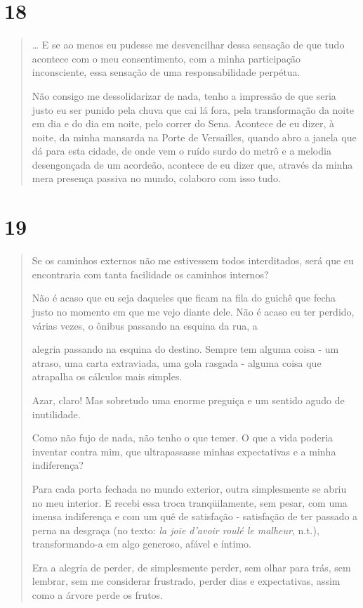 \section{18}\label{section-17}

\begin{quote}
\ldots{} E se ao menos eu pudesse me desvencilhar dessa sensação de que
tudo acontece com o meu consentimento, com a minha participação
inconsciente, essa sensação de uma responsabilidade perpétua.

Não consigo me dessolidarizar de nada, tenho a impressão de que seria
justo eu ser punido pela chuva que cai lá fora, pela transformação da
noite em dia e do dia em noite, pelo correr do Sena. Acontece de eu
dizer, à noite, da minha mansarda na Porte de Versailles, quando abro a
janela que dá para esta cidade, de onde vem o ruído surdo do metrô e a
melodia desengonçada de um acordeão, acontece de eu dizer que, através
da minha mera presença passiva no mundo, colaboro com isso tudo.
\end{quote}

\section{19}\label{section-18}

\begin{quote}
Se os caminhos externos não me estivessem todos interditados, será que
eu encontraria com tanta facilidade os caminhos internos?

Não é acaso que eu seja daqueles que ficam na fila do guichê que fecha
justo no momento em que me vejo diante dele. Não é acaso eu ter perdido,
várias vezes, o ônibus passando na esquina da rua, a

alegria passando na esquina do destino. Sempre tem alguma coisa - um
atraso, uma carta extraviada, uma gola rasgada - alguma coisa que
atrapalha os cálculos mais simples.

Azar, claro! Mas sobretudo uma enorme preguiça e um sentido agudo de
inutilidade.

Como não fujo de nada, não tenho o que temer. O que a vida poderia
inventar contra mim, que ultrapassasse minhas expectativas e a minha
indiferença?

Para cada porta fechada no mundo exterior, outra simplesmente se abriu
no meu interior. E recebi essa troca tranqüilamente, sem pesar, com uma
imensa indiferença e com um quê de satisfação - satisfação de ter
passado a perna na desgraça (no texto: \emph{la joie d'avoir roulé le
malheur}, n.t.), transformando-a em algo generoso, afável e íntimo.

Era a alegria de perder, de simplesmente perder, sem olhar para trás,
sem lembrar, sem me considerar frustrado, perder dias e expectativas,
assim como a árvore perde os frutos.
\end{quote}

